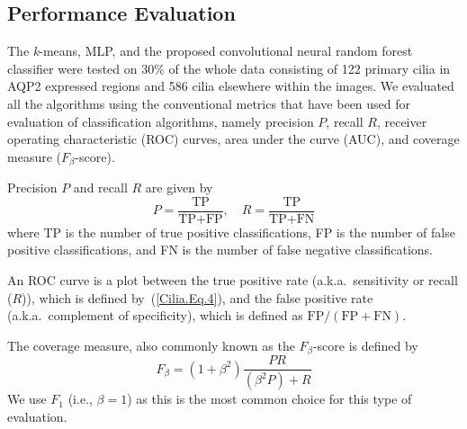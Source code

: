 \subsection{Performance Evaluation}

The \emph{k}-means, MLP, and the proposed convolutional neural random forest classifier were tested on 30\% of the whole data consisting of 122 primary cilia in AQP2 expressed regions and 586 cilia elsewhere within the images. We evaluated all the algorithms using the conventional metrics that have been used for evaluation of classification algorithms, namely precision $P$, recall $R$, receiver operating characteristic (ROC) curves, area under the curve (AUC), and coverage measure ($F_{\beta}$-score).

Precision $P$ and recall $R$ are given by
\begin{equation}
P = \frac{\text{TP}}{\text{TP} + \text{FP}}, \quad R = \frac{\text{TP}}{\text{TP} + \text{FN}}
\label{Cilia.Eq.4}
\end{equation}
where TP is the number of true positive classifications, FP is the number of false positive classifications, and FN is the number of false negative classifications.

An ROC curve is a plot between the true positive rate (a.k.a.\ sensitivity or recall ($R$)), which is defined by~(\ref{Cilia.Eq.4}), and the false positive rate (a.k.a.\ complement of specificity), which is defined as $\text{FP}/(\text{FP} + \text{FN})$.

The coverage measure, also commonly known as the $F_{\beta}$-score is defined by
\begin{equation}
F_{\beta} = \left(1 + \beta^{2}\right)\frac{PR}{\left(\beta^{2}P\right) + R}
\label{Cilia.Eq.5}
\end{equation}
We use $F_{1}$ (i.e., $\beta = 1$) as this is the most common choice for this type of evaluation.

